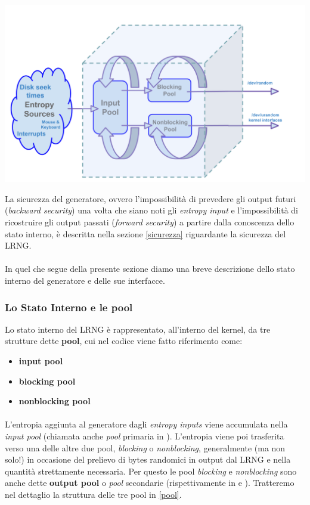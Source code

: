 \documentclass{article}
\begin{document}
  \centerline{\includegraphics[width=150mm]{img/internal_state.png}}
 
 
 La sicurezza del generatore, ovvero l'impossibilità di prevedere gli output
 futuri (\emph{backward security}) una volta che siano noti gli \emph{entropy
 input} e l'impossibilità di ricostruire gli output passati (\emph{forward
 security}) a partire dalla conoscenza dello stato interno, è descritta nella
 sezione \ref{sicurezza} riguardante la sicurezza del LRNG.
 \paragraph{}In quel che segue della presente sezione diamo una breve
 descrizione dello stato interno del generatore e delle sue interfacce.
 
 \subsubsection{Lo Stato Interno e le pool}
 Lo stato interno del LRNG è rappresentato, all'interno del kernel, da tre
 strutture dette \textbf{pool}, cui nel codice viene fatto riferimento come:
 \begin{itemize}
   \item \textbf{input pool} 
   \item \textbf{blocking pool}
   \item \textbf{nonblocking pool}
 \end{itemize}
 
 \paragraph{}L'entropia aggiunta al generatore dagli \emph{entropy inputs}
 viene accumulata nella \emph{input pool} (chiamata anche \emph{pool} primaria
 in \cite{gutt}). L'entropia viene poi trasferita verso una delle altre due
 pool, \emph{blocking} o \emph{nonblocking}, generalmente (ma non solo!) in
 occasione del prelievo di bytes randomici in output dal LRNG e nella quantità
 strettamente necessaria. Per questo le pool \emph{blocking} e
 \emph{nonblocking} sono anche dette \textbf{output pool} o \emph{pool}
 secondarie (rispettivamente in \cite{lach} e \cite{gutt}). Tratteremo nel
 dettaglio la struttura delle tre pool in \ref{pool}.
 
\end{document}
